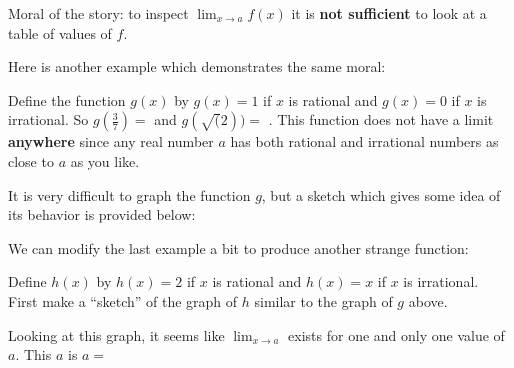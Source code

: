 Moral of the story:  to inspect $\lim_{x \to a} f(x)$ it is \textbf{not sufficient} to look at a table of values of $f$. 

Here is another example which demonstrates the same moral:

\begin{question}
	Define the function $g(x)$ by $g(x) = 1$ if $x$ is rational and $g(x) = 0$ if $x$ is irrational.  So $g(\frac{3}{7}) =$  and $g(\sqrt(2)) =$ .
	This function does not have a limit \textbf{anywhere} since any real number $a$ has both rational and irrational numbers  as close to $a$ as you like.
	
	It is very difficult to graph the function $g$, but a sketch which gives some idea of its behavior is provided below:
	
\end{question}

\begin{question}
We can modify the last example a bit to produce another strange function:

Define $h(x)$ by $h(x) = 2$ if $x$ is rational and $h(x) = x$ if $x$ is irrational.  First make a ``sketch'' of the graph of $h$ similar to the graph of $g$ above.

Looking at this graph, it seems like $\lim_{x \to a} $ exists for one and only one value of $a$.  This $a$ is $a = $  
\end{question}


